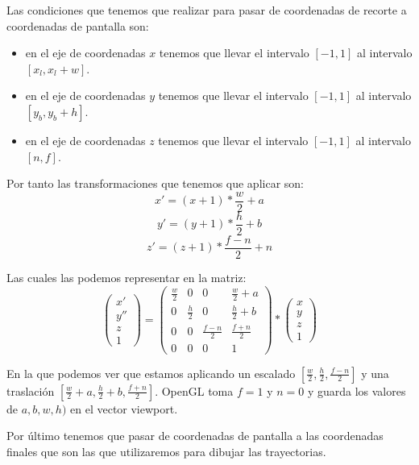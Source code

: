 \documentclass[a4paper,11pt, oneside]{book}
\begin{document}
Las condiciones que tenemos que realizar para pasar de coordenadas de recorte a coordenadas de pantalla son:
\begin{itemize}
	\item en el eje de coordenadas $x$ tenemos que llevar el intervalo $[-1,1]$ al intervalo $[x_l, x_l+w]$.
	\item en el eje de coordenadas $y$ tenemos que llevar el intervalo $[-1,1]$ al intervalo $[y_b, y_b+h]$.
	\item en el eje de coordenadas $z$ tenemos que llevar el intervalo $[-1,1]$ al intervalo $[n, f]$.
\end{itemize}

Por tanto las transformaciones que tenemos que aplicar son:
\begin{equation}
x' = (x+1)*\frac{w}{2}+a
\end{equation}
\begin{equation}
y' = (y+1)*\frac{h}{2}+b
\end{equation}
\begin{equation}
z' = (z+1)*\frac{f-n}{2}+n
\end{equation}

Las cuales las podemos representar en la matriz:
\begin{equation}
\begin{pmatrix}
x'\\
y''\\
z\\
1
\end{pmatrix} =
\begin{pmatrix}
\frac{w}{2} &0&0&\frac{w}{2}+a\\
0&\frac{h}{2} &0&\frac{h}{2}+b\\
0&0&\frac{f-n}{2} & \frac{f+n}{2}\\
0&0&0&1
\end{pmatrix}
*\begin{pmatrix}
x\\
y\\
z\\
1
\end{pmatrix}
\end{equation}

En la que podemos ver que estamos aplicando un escalado $[\frac{w}{2}, \frac{h}{2}, \frac{f-n}{2}]$ y una traslación $[\frac{w}{2}+a, \frac{h}{2}+b, \frac{f+n}{2}]$. OpenGL toma $f=1$ y $n=0$ y guarda los valores de $a,b,w,h)$ en el vector viewport. 

Por último tenemos que pasar de coordenadas de pantalla a las coordenadas  finales que son las que utilizaremos para dibujar las trayectorias.
\end{document}
